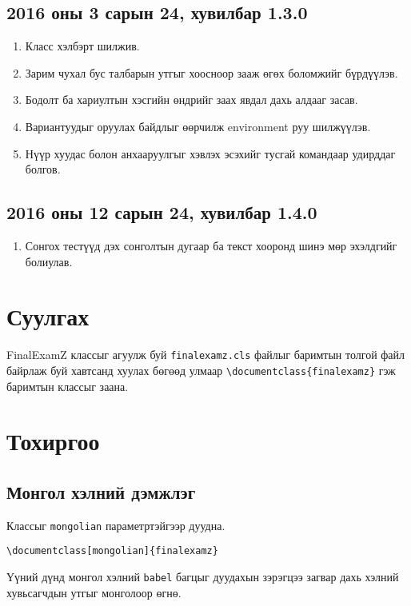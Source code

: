 \documentclass[10pt]{article}
\theoremstyle{definition}
\begin{document}
\subsection{2016 оны 3 сарын 24, хувилбар 1.3.0}

\begin{enumerate}
 \item Класс хэлбэрт шилжив.
 \item Зарим чухал бус талбарын утгыг хоосноор зааж өгөх боломжийг бүрдүүлэв.
 \item Бодолт ба хариултын хэсгийн өндрийг заах явдал дахь алдааг засав.
 \item Вариантуудыг оруулах байдлыг өөрчилж environment руу шилжүүлэв.
 \item Нүүр хуудас болон анхааруулгыг хэвлэх эсэхийг тусгай командаар удирддаг болгов.
\end{enumerate}

\subsection{2016 оны 12 сарын 24, хувилбар 1.4.0}

\begin{enumerate}
 \item Сонгох тестүүд дэх сонголтын дугаар ба текст хооронд шинэ мөр эхэлдгийг болиулав.
\end{enumerate}

\section{Суулгах}

FinalExamZ классыг агуулж буй \texttt{finalexamz.cls} файлыг баримтын толгой файл байрлаж буй хавтсанд хуулах бөгөөд улмаар \verb|\documentclass{finalexamz}| гэж баримтын классыг заана.

\section{Тохиргоо}

\subsection{Монгол хэлний дэмжлэг}

Классыг \texttt{mongolian} параметртэйгээр дуудна.
\begin{verbatim}
\documentclass[mongolian]{finalexamz}
\end{verbatim}
Үүний дүнд монгол хэлний \texttt{babel} багцыг дуудахын зэрэгцээ загвар дахь хэлний хувьсагчдын утгыг монголоор өгнө.
\end{document}
